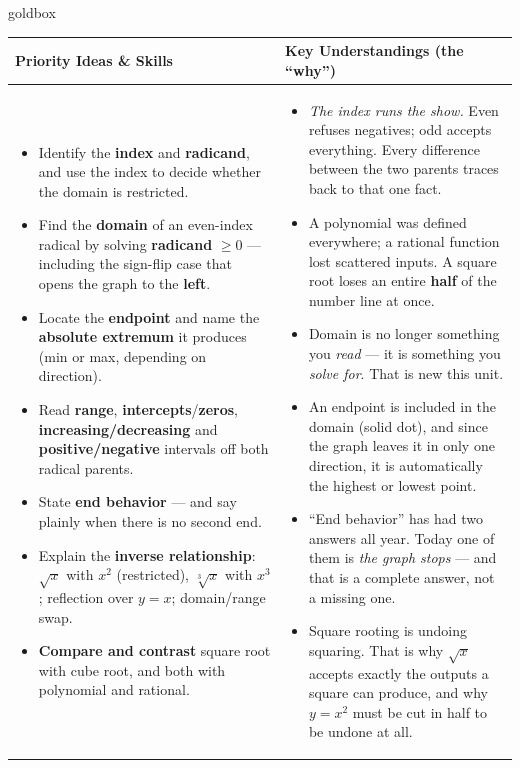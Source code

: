 \documentclass[10pt]{article}
\begin{document}
\renewcommand{\arraystretch}{1.4}
\begin{skillbox}{goldbox}
\begin{tabularx}{\linewidth}{@{}X|X@{}}
\textbf{Priority Ideas \& Skills} & \textbf{Key Understandings (the ``why'')} \\[2pt]
\hline
\vspace{-6pt}
\begin{itemize}[leftmargin=1.1em, nosep, after=\vspace{2pt}]
  \item Identify the \textbf{index} and \textbf{radicand}, and use the index to decide whether the domain is restricted.
  \item Find the \textbf{domain} of an even-index radical by solving \textbf{radicand} $\ge 0$ --- including the sign-flip case that opens the graph to the \textbf{left}.
  \item Locate the \textbf{endpoint} and name the \textbf{absolute extremum} it produces (min or max, depending on direction).
  \item Read \textbf{range}, \textbf{intercepts}/\textbf{zeros}, \textbf{increasing/decreasing} and \textbf{positive/negative} intervals off both radical parents.
  \item State \textbf{end behavior} --- and say plainly when there is no second end.
  \item Explain the \textbf{inverse relationship}: $\sqrt{x}$ with $x^2$ (restricted), $\sqrt[3]{x}$ with $x^3$; reflection over $y=x$; domain/range swap.
  \item \textbf{Compare and contrast} square root with cube root, and both with polynomial and rational.
\end{itemize}
&
\vspace{-6pt}
\begin{itemize}[leftmargin=1.1em, nosep, after=\vspace{2pt}]
  \item \emph{The index runs the show.} Even refuses negatives; odd accepts everything. Every difference between the two parents traces back to that one fact.
  \item A polynomial was defined everywhere; a rational function lost scattered inputs. A square root loses an entire \textbf{half} of the number line at once.
  \item Domain is no longer something you \emph{read} --- it is something you \emph{solve for}. That is new this unit.
  \item An endpoint is included in the domain (solid dot), and since the graph leaves it in only one direction, it is automatically the highest or lowest point.
  \item ``End behavior'' has had two answers all year. Today one of them is \emph{the graph stops} --- and that is a complete answer, not a missing one.
  \item Square rooting is undoing squaring. That is why $\sqrt{x}$ accepts exactly the outputs a square can produce, and why $y=x^2$ must be cut in half to be undone at all.
\end{itemize}
\end{tabularx}
\end{skillbox}
\end{document}
